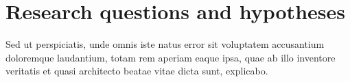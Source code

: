 \section{Research questions and hypotheses}


Sed ut perspiciatis, unde omnis iste natus error sit voluptatem accusantium doloremque laudantium, totam rem aperiam eaque ipsa, quae ab illo inventore veritatis et quasi architecto beatae vitae dicta sunt, explicabo.
